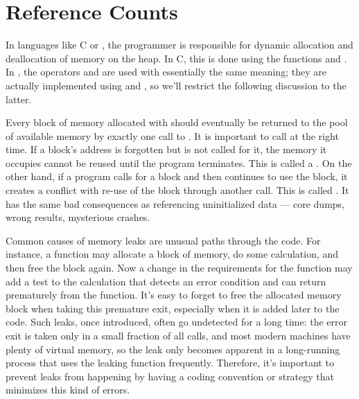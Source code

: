 \documentclass{manual}
\begin{document}
\section{Reference Counts
         \label{refcounts}}


In languages like C or \Cpp{}, the programmer is responsible for
dynamic allocation and deallocation of memory on the heap.  In C,
this is done using the functions  and
.  In \Cpp{}, the operators  and
 are used with essentially the same meaning; they are
actually implemented using  and
, so we'll restrict the following discussion to the
latter.

Every block of memory allocated with  should
eventually be returned to the pool of available memory by exactly one
call to .  It is important to call
 at the right time.  If a block's address is
forgotten but  is not called for it, the memory it
occupies cannot be reused until the program terminates.  This is
called a .  On the other hand, if a program calls
 for a block and then continues to use the block, it
creates a conflict with re-use of the block through another
 call.  This is called .
It has the same bad consequences as referencing uninitialized data ---
core dumps, wrong results, mysterious crashes.

Common causes of memory leaks are unusual paths through the code.  For
instance, a function may allocate a block of memory, do some
calculation, and then free the block again.  Now a change in the
requirements for the function may add a test to the calculation that
detects an error condition and can return prematurely from the
function.  It's easy to forget to free the allocated memory block when
taking this premature exit, especially when it is added later to the
code.  Such leaks, once introduced, often go undetected for a long
time: the error exit is taken only in a small fraction of all calls,
and most modern machines have plenty of virtual memory, so the leak
only becomes apparent in a long-running process that uses the leaking
function frequently.  Therefore, it's important to prevent leaks from
happening by having a coding convention or strategy that minimizes
this kind of errors.
\end{document}
